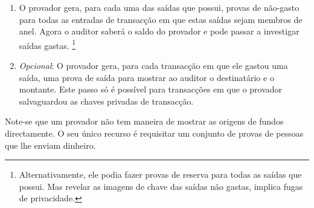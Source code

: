 \begin{enumerate}
    \item O provador gera, para cada uma das saídas que possui, provas de não-gasto para todas as entradas de transacção em que estas saídas sejam membros de anel. Agora o auditor saberá o saldo do provador e pode passar a investigar saídas gastas. \footnote{Alternativamente, ele podia fazer provas de reserva para todas as saídas que possui. Mas revelar as imagens de chave das saídas não gastas, implica fugas de privacidade.}
    \item {\em Opcional}: O provador gera, para cada transacção em que ele gastou uma saída, uma prova de saída para mostrar ao auditor o destinatário e o montante. Este passo só é possível para transacções em que o provador salvaguardou as chaves privadas de transacção.
\end{enumerate}{}
Note-se que um provador não tem maneira de mostrar as origens de fundos directamente. O seu único recurso é requisitar um conjunto de provas de pessoas que lhe enviam dinheiro.

